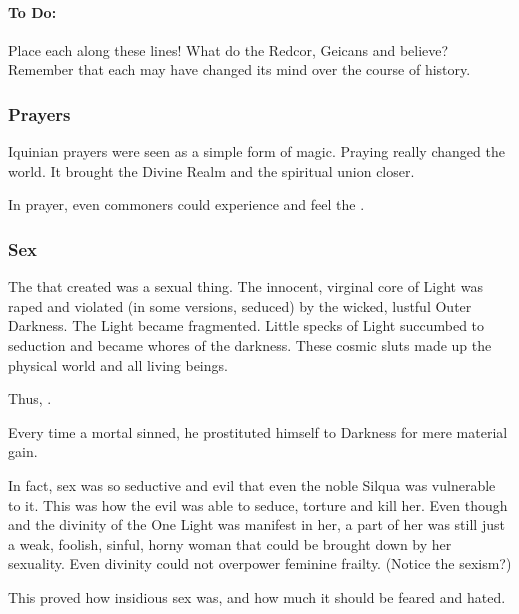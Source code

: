 \paragraph{To Do:}
  Place each \vclan along these lines!
  What do the Redcor, Geicans and \Telcras believe?
  Remember that each \vclan may have changed its mind over the course of history.





\subsubsection{Prayers}
Iquinian prayers were seen as a simple form of magic. 
Praying really changed the world. 
It brought the Divine Realm and the spiritual union closer. 

In prayer, even commoners could experience and feel the . 





\subsubsection{Sex}
The  that created  was a sexual thing. 
The innocent, virginal core of Light was raped and violated (in some versions, seduced) by the wicked, lustful Outer Darkness.
The Light became fragmented. 
Little specks of Light succumbed to seduction and became whores of the darkness.
These cosmic sluts made up the physical world and all living beings. 

Thus, . 

Every time a mortal sinned, he prostituted himself to Darkness for mere material gain. 

In fact, sex was so seductive and evil that even the noble Silqua was vulnerable to it. 
This was how the evil  was able to seduce, torture and kill her. 
Even though  and the divinity of the One Light was manifest in her, a part of her was still just a weak, foolish, sinful, horny woman that could be brought down by her sexuality. 
Even divinity could not overpower feminine frailty. 
(Notice the sexism?)

This proved how insidious sex was, and how much it should be feared and hated. 

